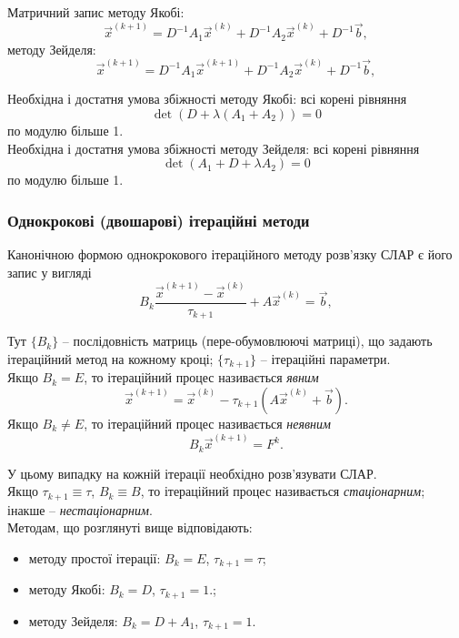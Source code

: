 Матричний запис методу Якобі:
\[ \vec x^{(k+1)} = D^{-1} A_1 \vec x^{(k)} + D^{-1} A_2 \vec x^{(k)} + D^{-1} \vec b,\]
методу Зейделя:
\[ \vec x^{(k+1)} = D^{-1} A_1 \vec x^{(k+1)} + D^{-1} A_2 \vec x^{(k)} + D^{-1} \vec b,\]

Необхідна і достатня умова збіжності методу Якобі: всі корені рівняння \[\det(D + \lambda(A_1 + A_2 )) = 0\] по модулю більше 1. \\

Необхідна і достатня умова збіжності методу Зейделя: всі корені рівняння \[\det(A_1 + D + \lambda A_2) = 0\] по модулю більше 1.

\subsubsection{Однокрокові (двошарові) ітераційні методи}

Канонічною формою однокрокового ітераційного методу розв'язку СЛАР є його запис у вигляді
\begin{equation}
	\label{eq:4.11}
	B_k \dfrac{\vec x^{(k+1)} - \vec x^{(k)}}{\tau_{k+1}} + A \vec x^{(k)} = \vec b,
\end{equation}

Тут $\{B_k\}$ -- послідовність матриць (пере-обумовлюючі матриці), що задають ітераційний метод на кожному кроці; $\{\tau_{k+1}\}$ -- ітераційні параметри. \\

Якщо $B_k = E$, то ітераційний процес називається \textit{явним}
\[ \vec x^{(k+1)} = \vec x^{(k)} - \tau_{k+1} \left(A \vec x^{(k)} + \vec b\right). \]
Якщо $B_k \ne E$, то ітераційний процес називається \textit{неявним}
\[ B_k \vec x^{(k+1)} = F^k. \]

У цьому випадку на кожній ітерації необхідно розв'язувати СЛАР. \\

Якщо $\tau_{k+1} \equiv \tau$, $B_k \equiv B$, то ітераційний процес називається \textit{стаціонарним}; інакше -- \textit{нестаціонарним}. \\

Методам, що розглянуті вище відповідають:
\begin{itemize}
	\item методу простої ітерації: $B_k = E$, $\tau_{k+1} = \tau$;
	\item методу Якобі: $B_k = D$, $\tau_{k+1} = 1$.;
	\item методу Зейделя: $B_k = D + A_1$, $\tau_{k+1} = 1$.
\end{itemize}

